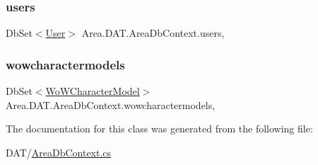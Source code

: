 \subsubsection{\texorpdfstring{users}{users}}
{\footnotesize\ttfamily Db\+Set$<$\mbox{\hyperlink{classArea_1_1Models_1_1User}{User}}$>$ Area.\+D\+A\+T.\+Area\+Db\+Context.\+users\hspace{0.3cm}{\ttfamily [get]}, {\ttfamily [set]}}

\mbox{\label{classArea_1_1DAT_1_1AreaDbContext_a6774df51b409ffb5ee27bf29186d4fe9}} 
\subsubsection{\texorpdfstring{wowcharactermodels}{wowcharactermodels}}
{\footnotesize\ttfamily Db\+Set$<$\mbox{\hyperlink{classArea_1_1Models_1_1WoWCharacterModel}{Wo\+W\+Character\+Model}}$>$ Area.\+D\+A\+T.\+Area\+Db\+Context.\+wowcharactermodels\hspace{0.3cm}{\ttfamily [get]}, {\ttfamily [set]}}



The documentation for this class was generated from the following file\+:\begin{DoxyCompactItemize}
\item 
D\+A\+T/\mbox{\hyperlink{AreaDbContext_8cs}{Area\+Db\+Context.\+cs}}\end{DoxyCompactItemize}
